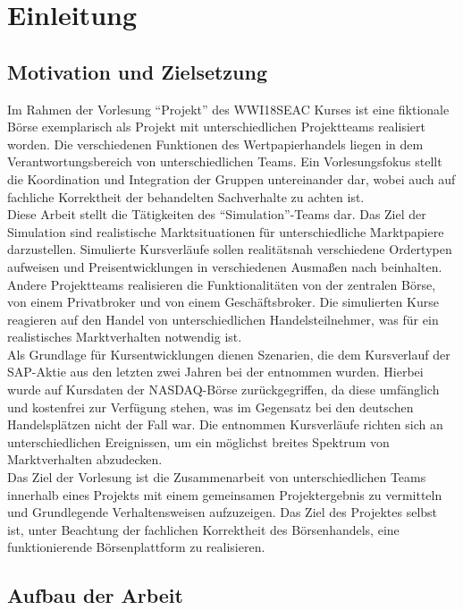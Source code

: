 \chapter{Einleitung}
\section{Motivation und Zielsetzung}

	
	Im Rahmen der Vorlesung \enquote{Projekt} des WWI18SEAC Kurses ist eine fiktionale Börse exemplarisch als Projekt mit unterschiedlichen Projektteams realisiert worden. Die verschiedenen Funktionen des Wertpapierhandels liegen in dem Verantwortungsbereich von unterschiedlichen Teams. Ein Vorlesungsfokus stellt die Koordination und Integration der Gruppen untereinander dar, wobei auch auf fachliche Korrektheit der behandelten Sachverhalte zu achten ist.\\
	Diese Arbeit stellt die Tätigkeiten des \enquote{Simulation}-Teams dar. Das Ziel der Simulation sind realistische Marktsituationen für unterschiedliche Marktpapiere darzustellen. Simulierte Kursverläufe sollen realitätsnah verschiedene Ordertypen aufweisen und Preisentwicklungen in verschiedenen Ausmaßen nach beinhalten. \\
	Andere Projektteams realisieren die Funktionalitäten von der zentralen Börse, von einem Privatbroker und von einem Geschäftsbroker. Die simulierten Kurse reagieren auf den Handel von unterschiedlichen Handelsteilnehmer, was für ein realistisches Marktverhalten notwendig ist.\\
	Als Grundlage für Kursentwicklungen dienen Szenarien, die dem Kursverlauf der SAP-Aktie aus den letzten zwei Jahren bei der entnommen wurden. Hierbei wurde auf Kursdaten der NASDAQ-Börse zurückgegriffen, da diese umfänglich und kostenfrei zur Verfügung stehen, was im Gegensatz bei den deutschen Handelsplätzen nicht der Fall war. Die entnommen Kursverläufe richten sich an unterschiedlichen Ereignissen, um ein möglichst breites Spektrum von Marktverhalten abzudecken.\\
	Das Ziel der Vorlesung ist die Zusammenarbeit von unterschiedlichen Teams innerhalb eines Projekts mit einem gemeinsamen Projektergebnis zu vermitteln und Grundlegende Verhaltensweisen aufzuzeigen. Das Ziel des Projektes selbst ist, unter Beachtung der fachlichen Korrektheit des Börsenhandels, eine funktionierende Börsenplattform zu realisieren.


\section{Aufbau der Arbeit}


